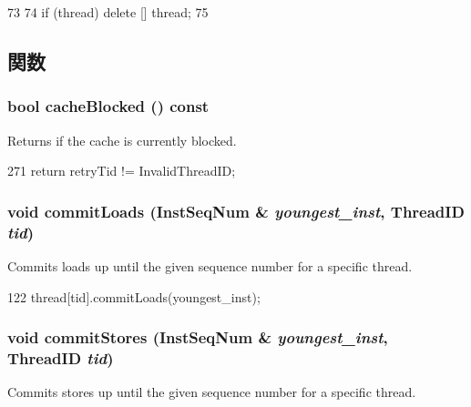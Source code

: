 \begin{DoxyCode}
73            {
74         if (thread) delete [] thread;
75     }
\end{DoxyCode}


\subsection{関数}
\hypertarget{classLSQ_a050e3736ea48bf74bd0c216b1cd3f494}{
\subsubsection[{cacheBlocked}]{\setlength{\rightskip}{0pt plus 5cm}bool cacheBlocked () const}}
\label{classLSQ_a050e3736ea48bf74bd0c216b1cd3f494}
Returns if the cache is currently blocked. 


\begin{DoxyCode}
271     { return retryTid != InvalidThreadID; }
\end{DoxyCode}
\hypertarget{classLSQ_af03ccef8cb6360230dd0060c8996be2d}{
\subsubsection[{commitLoads}]{\setlength{\rightskip}{0pt plus 5cm}void commitLoads ({\bf InstSeqNum} \& {\em youngest\_\-inst}, \/  {\bf ThreadID} {\em tid})}}
\label{classLSQ_af03ccef8cb6360230dd0060c8996be2d}
Commits loads up until the given sequence number for a specific thread. 


\begin{DoxyCode}
122     { thread[tid].commitLoads(youngest_inst); }
\end{DoxyCode}
\hypertarget{classLSQ_a096edcd9c962aec4ad10871da44aa5b9}{
\subsubsection[{commitStores}]{\setlength{\rightskip}{0pt plus 5cm}void commitStores ({\bf InstSeqNum} \& {\em youngest\_\-inst}, \/  {\bf ThreadID} {\em tid})}}
\label{classLSQ_a096edcd9c962aec4ad10871da44aa5b9}
Commits stores up until the given sequence number for a specific thread. 


